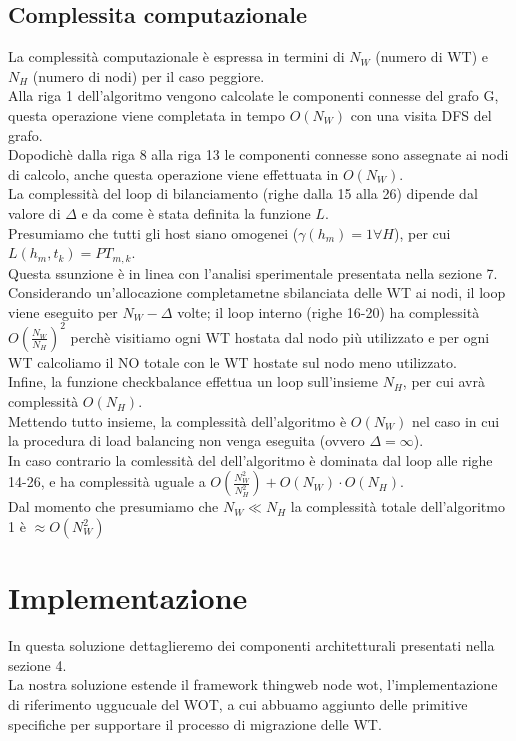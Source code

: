 \documentclass[11pt]{article}
\begin{document}
	\subsection{Complessita computazionale}
	La complessità computazionale è espressa in termini di $N_W$ (numero di WT) e $N_H$ (numero di nodi) per il caso peggiore. \\
	Alla riga 1 dell'algoritmo vengono calcolate le componenti connesse del grafo G, questa operazione viene completata in tempo $O(N_W)$ con una visita DFS del grafo. \\
	Dopodichè dalla riga 8 alla riga 13 le componenti connesse sono assegnate ai nodi di calcolo, anche questa operazione viene effettuata in $O(N_W)$. \\
	La complessità del loop di bilanciamento (righe dalla 15 alla 26) dipende dal valore di $\Delta$ e da come è stata definita la funzione $L$. \\
	Presumiamo che tutti gli host siano omogenei ($\gamma(h_m) = 1 \forall H$), per cui $L(h_m, t_k) = PT_{m,k}$.\\
	Questa ssunzione è in linea con l'analisi sperimentale presentata nella sezione 7. \\
	Considerando un'allocazione completametne sbilanciata delle WT ai nodi, il loop viene eseguito per $N_W - \Delta$ volte; il loop interno (righe 16-20) ha complessità $O(\frac{N_W}{N_H})^2$ perchè visitiamo ogni WT hostata dal nodo più utilizzato e per ogni WT calcoliamo il NO totale con le WT hostate sul nodo meno utilizzato. \\
	Infine, la funzione checkbalance effettua un loop sull'insieme $N_H$, per cui avrà complessità $O(N_H)$. \\
	Mettendo tutto insieme, la complessità dell'algoritmo è $O(N_W)$ nel caso in cui la procedura di load balancing non venga eseguita (ovvero $\Delta = \infty$). \\
	In caso contrario la comlessità del dell'algoritmo è dominata dal loop alle righe 14-26, e ha complessità uguale a $O(\frac{N^2_W}{N^2_H}) + O(N_W) \cdot O(N_H)$. \\
	Dal momento che presumiamo che $N_W \ll N_H$ la complessità totale dell'algoritmo 1 è $\approx O(N^2_W)$
	
	\section{Implementazione}
	In questa soluzione dettaglieremo dei componenti architetturali presentati nella sezione 4. \\
	La nostra soluzione estende il framework thingweb node wot, l'implementazione di riferimento uggucuale del WOT, a cui abbuamo aggiunto delle primitive specifiche per supportare il processo di migrazione delle WT.
	
\end{document}
